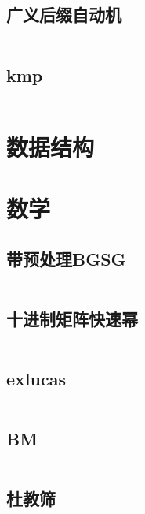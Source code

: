 \documentclass[a4paper,11pt]{article}
\begin{document}
    \subsection{广义后缀自动机}
    \inputminted[breaklines]{c++}{String/sam.cpp}

    \subsection{kmp}
    \inputminted[breaklines]{c++}{String/kmp.cpp}


    \newpage
    \section{数据结构}











    \newpage
    \section{数学} %

    \subsection{带预处理BGSG}
    \inputminted[breaklines]{c++}{Math/BGSG.cpp}

    \subsection{十进制矩阵快速幂}
    \inputminted[breaklines]{c++}{Math/快速幂.cpp}

    \subsection{exlucas}
    \inputminted[breaklines]{c++}{Math/exlucas.cpp}

    \subsection{BM}
    \inputminted[breaklines]{c++}{Math/BM.cpp}

    \subsection{杜教筛}
    \inputminted[breaklines]{c++}{Math/杜教筛.cpp}
\end{document}
